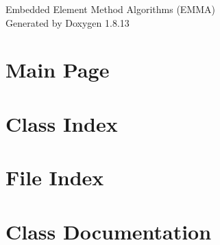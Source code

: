 \documentclass[twoside]{book}
\newcommand{\+}{\discretionary{\mbox{\scriptsize$\hookleftarrow$}}{}{}}
\newcommand{\clearemptydoublepage}{%
  \newpage{\pagestyle{empty}\cleardoublepage}%
}
\begin{document}
\hypersetup{pageanchor=false,
             bookmarksnumbered=true,
             pdfencoding=unicode
            }
\begin{titlepage}
\vspace*{7cm}
\begin{center}%
{\Large Embedded Element Method Algorithms (E\+M\+MA) }\\
\vspace*{1cm}
{\large Generated by Doxygen 1.8.13}\\
\end{center}
\end{titlepage}
\clearemptydoublepage
{}
\tableofcontents
\clearemptydoublepage
{}
\hypersetup{pageanchor=true}

\chapter{Main Page}
\label{index}\hypertarget{index}{}
\chapter{Class Index}

\chapter{File Index}

\chapter{Class Documentation}



\end{document}
